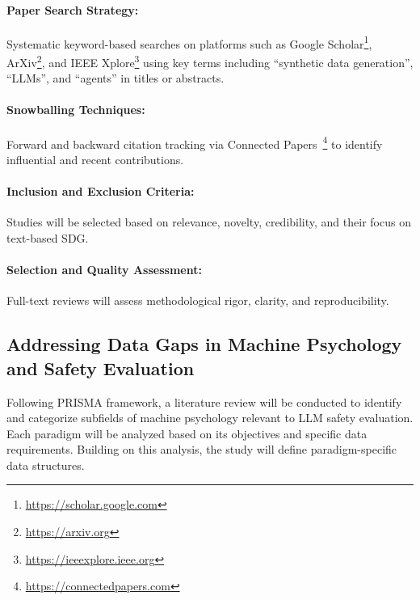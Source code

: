 \documentclass[12pt,a4paper]{article}
\newcommand{\qq}[1]{``#1''}  %
\begin{document}
\paragraph{Paper Search Strategy:}  
 Systematic keyword-based searches on platforms such as Google Scholar\footnote{\url{https://scholar.google.com}}, ArXiv\footnote{\url{https://arxiv.org}}, and IEEE Xplore\footnote{\url{https://ieeexplore.ieee.org}} using key terms including \qq{synthetic data generation}, \qq{LLMs}, and \qq{agents} in titles or abstracts.

\paragraph{Snowballing Techniques:}  
Forward and backward citation tracking via Connected Papers~\footnote{\url{https://connectedpapers.com}} to identify influential and recent contributions.

\paragraph{Inclusion and Exclusion Criteria:}  
Studies will be selected based on relevance, novelty, credibility, and their focus on text-based SDG.

\paragraph{Selection and Quality Assessment:}  
Full-text reviews will assess methodological rigor, clarity, and reproducibility. 







\subsection{Addressing Data Gaps in Machine Psychology and Safety Evaluation}

Following PRISMA\cite{PRISMA} framework, a literature review will be conducted to identify and categorize subfields of machine psychology relevant to LLM safety evaluation. Each paradigm will be analyzed based on its objectives and specific data requirements. Building on this analysis, the study will define paradigm-specific data structures.
\end{document}
